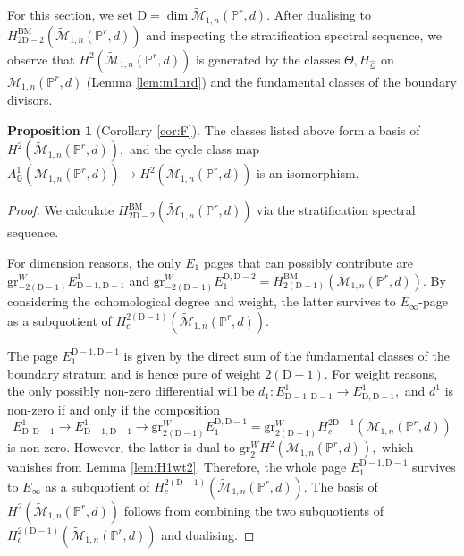 \documentclass[12pt,reqno]{amsart}
\theoremstyle{definition}
\theoremstyle{definition}
\theoremstyle{definition}
\theoremstyle{definition}
\newtheorem{proposition}[theorem]{Proposition}
\newcommand{\Mtil}{\widetilde{\mathcal{M}}}
\newcommand{\gr}{\mathrm{gr}}
\begin{document}
For this section, we set $\mathrm{D}  = \dim \Mtil_{1,n}(\mathbb{P}^r,d).$ After dualising to $H^{\mathrm{BM}}_{2\mathrm{D}-2}(\Mtil_{1,n}(\mathbb{P}^r,d))$ and inspecting the stratification spectral sequence, we observe that $H^2(\Mtil_{1,n}(\mathbb{P}^r,d))$ is generated by the classes $\Theta, H_{\hat{\mathcal{Q}}}$ on $\mathcal{M}_{1,n}(\mathbb{P}^r,d)$ (Lemma \ref{lem:m1nrd}) and the fundamental classes of the boundary divisors.
\begin{proposition}[Corollary \ref{cor:F}]\label{prop:Pic}
  The classes listed above form a basis of $H^2(\Mtil_{1,n}(\mathbb{P}^r,d)),$ and the cycle class map $A^1_{\mathbb{Q}}(\Mtil_{1,n}(\mathbb{P}^r,d))\to H^2(\Mtil_{1,n}(\mathbb{P}^r,d))$ is an isomorphism.
\end{proposition}
\begin{proof}
  We calculate $H^{\mathrm{BM}}_{2\mathrm{D}-2}(\Mtil_{1,n}(\mathbb{P}^r,d))$ via the stratification spectral sequence. 
  
  For dimension reasons, the only $E_1$ pages that can possibly contribute are $\gr^{W}_{-2(\mathrm{D}-1)} E^1_{\mathrm{D}-1, \mathrm{D}-1}$ and $\gr^{W}_{-2(\mathrm{D}-1)} E_1^{\mathrm{D}, \mathrm{D}-2} = H^{\mathrm{BM}}_{2(\mathrm{D}-1)}(\mathcal{M}_{1,n}(\mathbb{P}^r,d)).$ By considering the cohomological degree and weight, the latter survives to $E_\infty$-page as a subquotient of $H_c^{2(\mathrm{D}-1)}(\Mtil_{1,n}(\mathbb{P}^r,d)).$
  
  The page $E_1^{\mathrm{D}-1, \mathrm{D}-1}$ is given by the direct sum of the fundamental classes of the boundary stratum and is hence pure of weight $2(\mathrm{D}-1)$. For weight reasons, the only possibly non-zero differential will be $d_1: E^1_{\mathrm{D}-1, \mathrm{D}-1}\to E^1_{\mathrm{D}, \mathrm{D}-1},$ and $d^1$ is non-zero if and only if the composition $$E^1_{\mathrm{D}, \mathrm{D}-1}\to E^1_{\mathrm{D}-1, \mathrm{D}-1}\to \mathrm{gr}^W_{2(\mathrm{D}-1)}E_1^{\mathrm{D}, \mathrm{D}-1}=\mathrm{gr}^W_{2(\mathrm{D}-1)} H_c^{2\mathrm{D}-1}(\mathcal{M}_{1,n}(\mathbb{P}^r,d))$$ is non-zero. However, the latter is dual to $\mathrm{gr}^W_{2} H^{2}(\mathcal{M}_{1,n}(\mathbb{P}^r,d)),$ which vanishes from Lemma \ref{lem:H1wt2}. Therefore, the whole page $E_1^{\mathrm{D}-1, \mathrm{D}-1}$ survives to $E_\infty$ as a subquotient of $H_c^{2(\mathrm{D}-1)}(\Mtil_{1,n}(\mathbb{P}^r,d)).$ The basis of $H^{2}(\Mtil_{1,n}(\mathbb{P}^r,d))$ follows from combining the two subquotients of $H_c^{2(\mathrm{D}-1)}(\Mtil_{1,n}(\mathbb{P}^r,d))$ and dualising. 
  

\end{proof}
\end{document}
